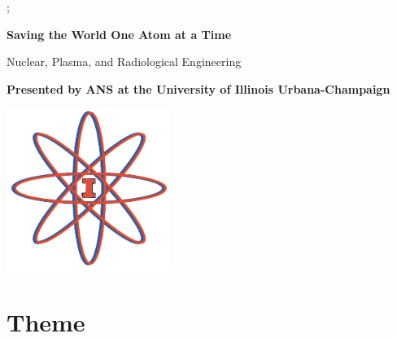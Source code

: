 \documentclass[12pt, letterpaper]{article}
\begin{document}
\begin{titlepage}
;


   \begin{center}

       \vspace*{1cm}
 
       \textbf{Saving the World One Atom at a Time}
 
       \vspace{0.5cm}
       Nuclear, Plasma, and Radiological Engineering
 
       \vspace{1.5cm}
 
       \textbf{Presented by ANS at the University of Illinois Urbana-Champaign}
 
       \vfill
       \vspace{0.8cm}
 
       \includegraphics[width=0.4\textwidth]{ans_sc_logo3.png}
   \end{center}
\end{titlepage}

\clearpage
\tableofcontents
\newpage


\section{Theme}
\end{document}
